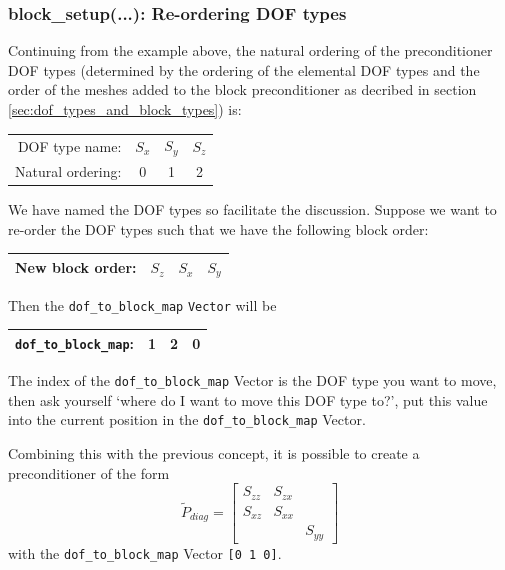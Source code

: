 \subsubsection{block\_setup(...): Re-ordering DOF types\label{sec:block_setup_reordering_dof_types}}
Continuing from the example above, the natural ordering of the preconditioner DOF types (determined by the ordering of the elemental DOF types and the order of the meshes added to the block preconditioner as decribed in section \ref{sec:dof_types_and_block_types}) is:
\begin{center}
    \begin{tabular}{ | r | c c c |}
    \hline
    DOF type name: & $S_{x}$ & $S_{y}$ & $S_{z}$ \\ 
    Natural ordering: & 0 & 1 & 2 \\ 
    \hline
    \end{tabular}
\end{center}
We have named the DOF types so facilitate the discussion. Suppose we want to re-order the DOF types such that we have the following block order:
\begin{center}
    \begin{tabular}{ | r | c c c |}
    \hline
    New block order: & $S_{z}$ & $S_{x}$ & $S_{y}$ \\ 
    \hline
    \end{tabular}
\end{center}
Then the \verb+dof_to_block_map+ \verb+Vector+ will be
\begin{center}
    \begin{tabular}{ | r | c c c |}
    \hline
    \verb+dof_to_block_map+: & 1 & 2 & 0 \\ 
    \hline
    \end{tabular}
\end{center}
The index of the \verb+dof_to_block_map+ Vector is the DOF type you want to move, then ask yourself `where do I want to move this DOF type to?', put this value into the current position in the \verb+dof_to_block_map+ Vector.

Combining this with the previous concept, it is possible to create a preconditioner of the form
\begin{equation*}
\tilde{P}_{diag} =
\begin{bmatrix}
S_{zz}&S_{zx}&       \\
S_{xz}&S_{xx}&       \\
      &      &S_{yy}
\end{bmatrix}
\end{equation*}
with the \verb+dof_to_block_map+ Vector \verb+[0 1 0]+.


